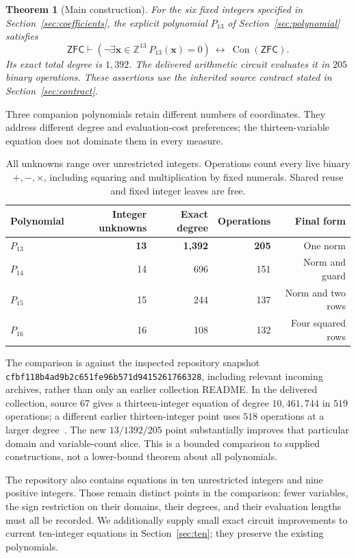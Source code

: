 \documentclass[11pt]{article}
\newtheorem{theorem}{Theorem}[section]
\theoremstyle{definition}
\theoremstyle{remark}
\newcommand{\Z}{\mathbb Z}
\newcommand{\ZFC}{\mathsf{ZFC}}
\newcommand{\Con}{\operatorname{Con}}
\newcommand{\pin}{\nolinkurl{cfbf118b4ad9b2c651fe96b571d9415261766328}}
\begin{document}
\begin{theorem}[Main construction]\label{thm:main}
For the six fixed integers specified in Section~\ref{sec:coefficients},
the explicit polynomial \(P_{13}\) of Section~\ref{sec:polynomial}
satisfies
\[
 \ZFC\vdash
 \left(\neg\exists\mathbf x\in\Z^{13}\ P_{13}(\mathbf x)=0\right)
 \ \longleftrightarrow\ \Con(\ZFC).
\]
Its exact total degree is \(1,392\). The delivered arithmetic circuit
evaluates it in \(205\) binary operations. These assertions use the
inherited source contract stated in Section~\ref{sec:contract}.
\end{theorem}

Three companion polynomials retain different numbers of coordinates.
They address different degree and evaluation-cost preferences; the
thirteen-variable equation does not dominate them in every measure.

\begin{table}[ht]
\centering
\begin{tabular}{@{}lrrrr@{}}
\toprule
Polynomial & Integer unknowns & Exact degree & Operations & Final form\\
\midrule
\(P_{13}\) & \textbf{13} & \textbf{1,392} & \textbf{205} & One norm\\
\(P_{14}\) & 14 & 696 & 151 & Norm and guard\\
\(P_{15}\) & 15 & 244 & 137 & Norm and two rows\\
\(P_{16}\) & 16 & 108 & 132 & Four squared rows\\
\bottomrule
\end{tabular}
\caption{All unknowns range over unrestricted integers. Operations count
every live binary \(+,-,\times\), including squaring and multiplication by
fixed numerals. Shared reuse and fixed integer leaves are free.}
\label{tab:main}
\end{table}

The comparison is against the inspected repository snapshot \pin,
including relevant incoming archives, rather than only an earlier
collection README. In the delivered collection, source 67 gives a
thirteen-integer equation of degree \(10,461,744\) in \(519\) operations;
a different earlier thirteen-integer point uses \(518\) operations at a
larger degree~\cite{p67,repo}. The new \(13/1392/205\) point substantially
improves that particular domain and variable-count slice. This is a
bounded comparison to supplied constructions, not a lower-bound theorem
about all polynomials.

The repository also contains equations in ten unrestricted integers and
nine positive integers. Those remain distinct points in the comparison:
fewer variables, the sign restriction on their domains, their degrees,
and their evaluation lengths must all be recorded. We additionally
supply small exact circuit improvements to current ten-integer equations
in Section~\ref{sec:ten}; they preserve the existing polynomials.
\end{document}
